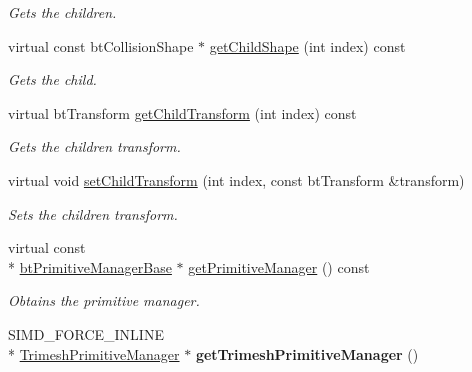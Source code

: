 \begin{DoxyCompactItemize}
\begin{DoxyCompactList}\small\item\em Gets the children. \end{DoxyCompactList}\item 
\hypertarget{classbt_g_impact_mesh_shape_part_add9463d3616dec79a3bc4feace9683c3}{virtual const bt\+Collision\+Shape $\ast$ \hyperlink{classbt_g_impact_mesh_shape_part_add9463d3616dec79a3bc4feace9683c3}{get\+Child\+Shape} (int index) const }\label{classbt_g_impact_mesh_shape_part_add9463d3616dec79a3bc4feace9683c3}

\begin{DoxyCompactList}\small\item\em Gets the child. \end{DoxyCompactList}\item 
\hypertarget{classbt_g_impact_mesh_shape_part_a6c4e647b0437ee898f8742d427de9181}{virtual bt\+Transform \hyperlink{classbt_g_impact_mesh_shape_part_a6c4e647b0437ee898f8742d427de9181}{get\+Child\+Transform} (int index) const }\label{classbt_g_impact_mesh_shape_part_a6c4e647b0437ee898f8742d427de9181}

\begin{DoxyCompactList}\small\item\em Gets the children transform. \end{DoxyCompactList}\item 
virtual void \hyperlink{classbt_g_impact_mesh_shape_part_a0a97d3769fb7d3f583e41da6b284bcc1}{set\+Child\+Transform} (int index, const bt\+Transform \&transform)
\begin{DoxyCompactList}\small\item\em Sets the children transform. \end{DoxyCompactList}\item 
\hypertarget{classbt_g_impact_mesh_shape_part_a195870142c61421252805a170fb978cf}{virtual const \\*
\hyperlink{classbt_primitive_manager_base}{bt\+Primitive\+Manager\+Base} $\ast$ \hyperlink{classbt_g_impact_mesh_shape_part_a195870142c61421252805a170fb978cf}{get\+Primitive\+Manager} () const }\label{classbt_g_impact_mesh_shape_part_a195870142c61421252805a170fb978cf}

\begin{DoxyCompactList}\small\item\em Obtains the primitive manager. \end{DoxyCompactList}\item 
\hypertarget{classbt_g_impact_mesh_shape_part_a7b6bceae8902afd9d35a734899f07c7b}{S\+I\+M\+D\+\_\+\+F\+O\+R\+C\+E\+\_\+\+I\+N\+L\+I\+N\+E \\*
\hyperlink{classbt_g_impact_mesh_shape_part_1_1_trimesh_primitive_manager}{Trimesh\+Primitive\+Manager} $\ast$ {\bfseries get\+Trimesh\+Primitive\+Manager} ()}\label{classbt_g_impact_mesh_shape_part_a7b6bceae8902afd9d35a734899f07c7b}


\end{DoxyCompactItemize}
